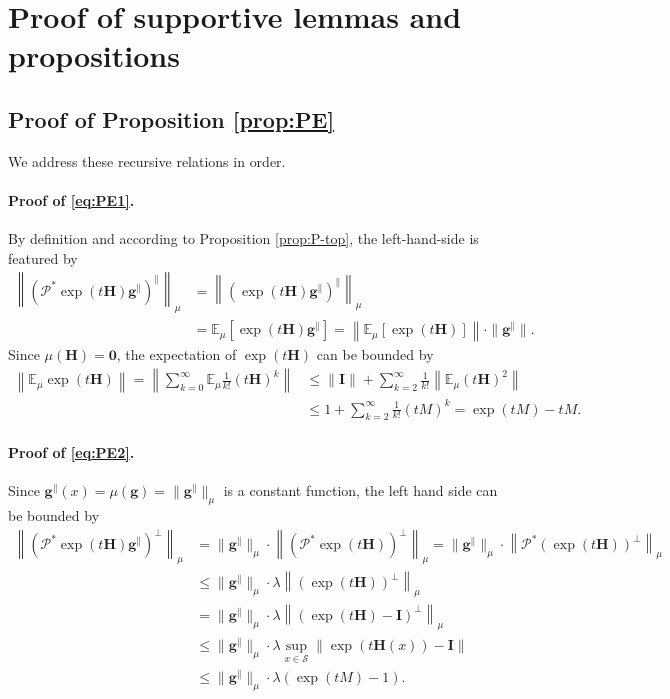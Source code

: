 \section{Proof of supportive lemmas and propositions}

\subsection{Proof of Proposition \ref{prop:PE}}\label{proof-prop-PE}
We address these recursive relations in order.
\paragraph{Proof of \eqref{eq:PE1}.} By definition and according to Proposition \ref{prop:P-top}, the left-hand-side is featured by
\begin{align*}
\left\|\left(\mathcal{P}^* \exp(t\bm{H})\bm{g}^{\parallel}\right)^{\parallel}\right\|_{\mu} &= \left\|\left(\exp(t\bm{H})\bm{g}^{\parallel}\right)^{\parallel}\right\|_{\mu} \\ 
&= \mathbb{E}_{\mu}\left[\exp(t\bm{H})\bm{g}^{\parallel}\right] = \left\|\mathbb{E}_{\mu} [\exp(t\bm{H})]\right\| \cdot \|\bm{g}^{\parallel}\|.
\end{align*}
Since $\mu(\bm{H}) = \bm{0}$, the expectation of $\exp(t\bm{H})$ can be bounded by
\begin{align*}
\left\|\mathbb{E}_{\mu}\exp(t\bm{H})\right\| = \left\|\sum_{k=0}^{\infty} \mathbb{E}_{\mu} \frac{1}{k!}(t\bm{H})^k\right\| &\leq \|\bm{I}\| + \sum_{k=2}^{\infty} \frac{1}{k!} \left\|\mathbb{E}_{\mu}(t\bm{H})^2 \right\| \\ 
&\leq 1 + \sum_{k=2}^{\infty} \frac{1}{k!} (tM)^k = \exp(tM) - tM.
\end{align*}
\paragraph{Proof of \eqref{eq:PE2}.} Since $\bm{g}^{\parallel}(x) = \mu(\bm{g}) = \|\bm{g}^{\parallel}\|_{\mu}$ is a constant function, the left hand side can be bounded by
\begin{align*}
\left\|\left(\mathcal{P}^* \exp(t\bm{H})\bm{g}^{\parallel}\right)^{\perp}\right\|_{\mu}&= \|\bm{g}^{\parallel}\|_{\mu} \cdot \left\|\left(\mathcal{P}^* \exp(t\bm{H})\right)^{\perp}\right\|_{\mu} = \|\bm{g}^{\parallel}\|_{\mu} \cdot \left\|\mathcal{P}^* \left(\exp(t\bm{H})\right)^{\perp}\right\|_{\mu} \\ 
&\leq \|\bm{g}^{\parallel}\|_{\mu} \cdot\lambda \left\| \left(\exp(t\bm{H})\right)^{\perp}\right\|_{\mu} \\ 
&= \|\bm{g}^{\parallel}\|_{\mu} \cdot\lambda \left\| \left(\exp(t\bm{H})-\bm{I}\right)^{\perp}\right\|_{\mu} \\ 
&\leq \|\bm{g}^{\parallel}\|_{\mu} \cdot\lambda \sup_{x \in \mathcal{S}} \left\| \exp(t\bm{H}(x))-\bm{I}\right\| \\ 
&\leq \|\bm{g}^{\parallel}\|_{\mu} \cdot\lambda (\exp(tM)-1).
\end{align*}
